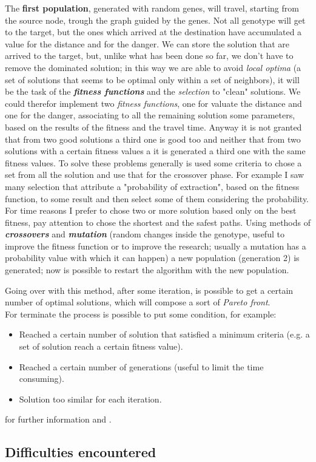 \documentclass[a4paper,11pt]{report}
\begin{document}
The \textbf{first population}, generated with random genes, will travel, starting from the source node, trough the graph guided by the genes. Not all genotype will get to the target, but the ones which arrived at the destination have accumulated a value for the distance and for the danger.
We can store the solution that are arrived to the target, but, unlike what has been done so far, we don't have to remove the dominated solution; in this way we are able to avoid \textit{local optima} (a set of solutions that seems to be optimal only within a set of neighbors), it will be the task of the \textit{\textbf{fitness functions}} and the \textit{selection} to "clean" solutions. 
We could therefor implement two \textit{fitness functions}, one for valuate the distance and one for the danger, associating to all the remaining solution some parameters, based on the results of the fitness and the travel time.
Anyway it is not granted that from two good solutions a third one is good too and neither that from two solutions with a certain fitness values a it is generated a third one with the same fitness values. To solve these problems generally is used some criteria to chose a set from all the solution and use that for the crossover phase.
For example I saw many selection that attribute a "probability of extraction", based on the fitness function, to some result and then select some of them considering the probability.
For time reasons I prefer to chose two or more solution based only on the best fitness, pay attention to chose the shortest and the safest paths.
Using methods of \textbf{\textit{crossovers}} and \textbf{\textit{mutation}} (random changes inside the genotype, useful to improve the fitness function or to improve the research; usually a mutation has a probability value with which it can happen) a new population (generation 2) is generated; now is possible to restart the algorithm with the new population. 

Going over with this method, after some iteration, is possible to get a certain number of optimal solutions, which will compose a sort of \textit{Pareto front}.\\
For terminate the process is possible to put some condition, for example:
\begin{itemize}
	\item Reached a certain number of solution that satisfied a minimum criteria (e.g. a set of solution reach a certain fitness value).
	\item Reached a certain number of generations (useful to limit the time consuming).
	\item  Solution too similar for each iteration.
\end{itemize}


for further information \cite{GAWikipedia} and \cite{GAArticle}. 


\subsection{Difficulties encountered}





\end{document}
